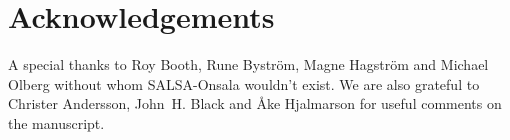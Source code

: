 \chapter*{Acknowledgements}
A special thanks to Roy Booth, Rune Bystr\"om, Magne Hagstr\"om and Michael
Olberg without whom SALSA-Onsala wouldn't exist. 
We are also grateful to Christer Andersson, John~H. Black and \AA ke Hjalmarson for 
useful comments on the manuscript. 

